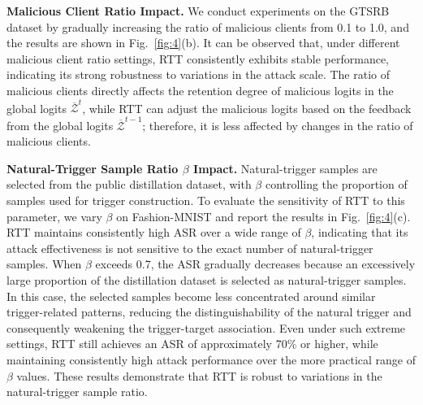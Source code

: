 \documentclass[lettersize,journal]{IEEEtran}
\begin{document}
\textbf{Malicious Client Ratio Impact.} 
We conduct experiments on the GTSRB dataset by gradually increasing the ratio of malicious clients from 0.1 to 1.0, and the results are shown in Fig.~\ref{fig:4}(b).
It can be observed that, under different malicious client ratio settings, RTT consistently exhibits stable performance, indicating its strong robustness to variations in the attack scale.
The ratio of malicious clients directly affects the retention degree of malicious logits in the global logits $\overline{\mathcal{Z}}^t$, while RTT can adjust the malicious logits based on the feedback from the global logits $\overline{\mathcal{Z}}^{t-1}$; therefore, it is less affected by changes in the ratio of malicious clients.

\textbf{Natural-Trigger Sample Ratio $\beta$ Impact.} 
Natural-trigger samples are selected from the public distillation dataset, with $\beta$ controlling the proportion of samples used for trigger construction.
To evaluate the sensitivity of RTT to this parameter, we vary $\beta$ on Fashion-MNIST and report the results in Fig.~\ref{fig:4}(c).
RTT maintains consistently high ASR over a wide range of $\beta$, indicating that its attack effectiveness is not sensitive to the exact number of natural-trigger samples.
When $\beta$ exceeds 0.7, the ASR gradually decreases because an excessively large proportion of the distillation dataset is selected as natural-trigger samples.
In this case, the selected samples become less concentrated around similar trigger-related patterns, reducing the distinguishability of the natural trigger and consequently weakening the trigger-target association.
Even under such extreme settings, RTT still achieves an ASR of approximately 70\% or higher, while maintaining consistently high attack performance over the more practical range of $\beta$ values.
These results demonstrate that RTT is robust to variations in the natural-trigger sample ratio.
\end{document}
